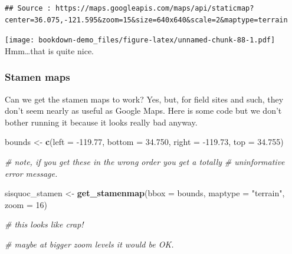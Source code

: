 \documentclass[]{book}
\newenvironment{Shaded}{\begin{snugshade}}{\end{snugshade}}
\newcommand{\KeywordTok}[1]{\textcolor[rgb]{0.13,0.29,0.53}{\textbf{{#1}}}}
\newcommand{\DataTypeTok}[1]{\textcolor[rgb]{0.13,0.29,0.53}{{#1}}}
\newcommand{\DecValTok}[1]{\textcolor[rgb]{0.00,0.00,0.81}{{#1}}}
\newcommand{\FloatTok}[1]{\textcolor[rgb]{0.00,0.00,0.81}{{#1}}}
\newcommand{\StringTok}[1]{\textcolor[rgb]{0.31,0.60,0.02}{{#1}}}
\newcommand{\CommentTok}[1]{\textcolor[rgb]{0.56,0.35,0.01}{\textit{{#1}}}}
\newcommand{\NormalTok}[1]{{#1}}
\theoremstyle{definition}
\theoremstyle{definition}
\theoremstyle{remark}
\begin{document}
\begin{Shaded}
\end{Shaded}

\begin{verbatim}
## Source : https://maps.googleapis.com/maps/api/staticmap?center=36.075,-121.595&zoom=15&size=640x640&scale=2&maptype=terrain
\end{verbatim}

\texttt{[image: bookdown-demo\_files/figure-latex/unnamed-chunk-88-1.pdf]}
Hmm\ldots{}that is quite nice.

\subsubsection{Stamen maps}\label{stamen-maps}

Can we get the stamen maps to work? Yes, but, for field sites and such,
they don't seem nearly as useful as Google Maps. Here is some code but
we don't bother running it because it looks really bad anyway.

\begin{Shaded}
\begin{Highlighting}[]
\NormalTok{bounds <-}\StringTok{ }\KeywordTok{c}\NormalTok{(}\DataTypeTok{left =} \NormalTok{-}\FloatTok{119.77}\NormalTok{, }
            \DataTypeTok{bottom =} \FloatTok{34.750}\NormalTok{,}
            \DataTypeTok{right =} \NormalTok{-}\FloatTok{119.73}\NormalTok{,}
            \DataTypeTok{top =} \FloatTok{34.755}\NormalTok{)}

\CommentTok{# note, if you get these in the wrong order you get a totally }
\CommentTok{# uninformative error message.}

\NormalTok{sisquoc_stamen <-}\StringTok{ }\KeywordTok{get_stamenmap}\NormalTok{(}\DataTypeTok{bbox =} \NormalTok{bounds, }\DataTypeTok{maptype =} \StringTok{"terrain"}\NormalTok{, }\DataTypeTok{zoom =} \DecValTok{16}\NormalTok{)}

\CommentTok{# this looks like crap!}

\CommentTok{# maybe at bigger zoom levels it would be OK.}
\end{Highlighting}
\end{Shaded}
\end{document}
